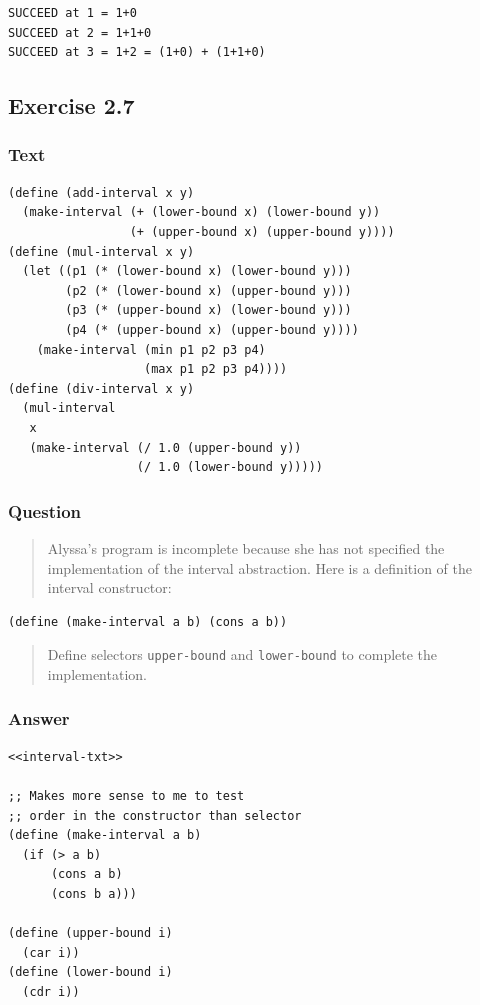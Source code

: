 \documentclass[final,fleqn,titlepage,twoside]{article}
\begin{document}
\begin{verbatim}
SUCCEED at 1 = 1+0
SUCCEED at 2 = 1+1+0
SUCCEED at 3 = 1+2 = (1+0) + (1+1+0)
\end{verbatim}

\subsection{Exercise 2.7}
\label{sec:org0bf5559}
\subsubsection{Text}
\label{sec:org072f14b}
\begin{verbatim}
(define (add-interval x y)
  (make-interval (+ (lower-bound x) (lower-bound y))
                 (+ (upper-bound x) (upper-bound y))))
(define (mul-interval x y)
  (let ((p1 (* (lower-bound x) (lower-bound y)))
        (p2 (* (lower-bound x) (upper-bound y)))
        (p3 (* (upper-bound x) (lower-bound y)))
        (p4 (* (upper-bound x) (upper-bound y))))
    (make-interval (min p1 p2 p3 p4)
                   (max p1 p2 p3 p4))))
(define (div-interval x y)
  (mul-interval
   x
   (make-interval (/ 1.0 (upper-bound y))
                  (/ 1.0 (lower-bound y)))))
\end{verbatim}

\subsubsection{Question}
\label{sec:orgfd27d6f}
\begin{quote}
Alyssa's program is incomplete because she has not specified the implementation
of the interval abstraction. Here is a definition of the interval constructor:
\end{quote}

\begin{verbatim}
(define (make-interval a b) (cons a b))
\end{verbatim}

\begin{quote}
Define selectors \texttt{upper-bound} and \texttt{lower-bound} to complete
the implementation.
\end{quote}

\subsubsection{Answer}
\label{sec:org367c7f9}
\begin{verbatim}
<<interval-txt>>

;; Makes more sense to me to test
;; order in the constructor than selector
(define (make-interval a b)
  (if (> a b)
      (cons a b)
      (cons b a)))

(define (upper-bound i)
  (car i))
(define (lower-bound i)
  (cdr i))
\end{verbatim}
\end{document}
